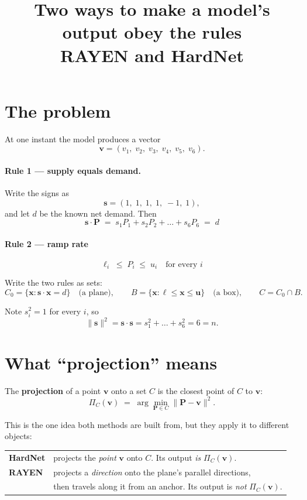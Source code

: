 \documentclass[11pt]{article}
\title{Two ways to make a model's output obey the rules\\
\large RAYEN and HardNet}
\author{}
\date{}
\begin{document}
\maketitle

\section{The problem}

At one instant the model produces a vector
\[
\mathbf{v} = (v_1,\;v_2,\;v_3,\;v_4,\;v_5,\;v_6).
\]

\paragraph{Rule 1 --- supply equals demand.} Write the signs as
\[
\mathbf{s} = (1,\;1,\;1,\;1,\;-1,\;1),
\]
and let $d$ be the known net demand. Then
\[
\boxed{\;\mathbf{s}\cdot\mathbf{P} \;=\; s_1P_1+s_2P_2+\dots+s_6P_6 \;=\; d\;}
\]

\paragraph{Rule 2 --- ramp rate}
\[
\boxed{\;\ell_i \;\le\; P_i \;\le\; u_i \quad\text{for every } i\;}
\]

Write the two rules as sets:
\[
C_0 = \{\mathbf{x} : \mathbf{s}\cdot\mathbf{x} = d\}
\quad\text{(a plane)},
\qquad
B = \{\mathbf{x} : \bm{\ell}\le\mathbf{x}\le\mathbf{u}\}
\quad\text{(a box)},
\qquad
C = C_0\cap B .
\]

Note $s_i^2=1$ for every $i$, so
\[
\|\mathbf{s}\|^2 = \mathbf{s}\cdot\mathbf{s} = s_1^2+\dots+s_6^2 = 6 = n. \tag{$\ast$}
\]

\section{What ``projection'' means}

The \textbf{projection} of a point $\mathbf{v}$ onto a set $C$ is the closest
point of $C$ to $\mathbf{v}$:
\[
\Pi_C(\mathbf{v}) \;=\; \arg\min_{\mathbf{P}\in C} \|\mathbf{P}-\mathbf{v}\|^2 .
\]

This is the one idea both methods are built from, but they apply it to different
objects:

\begin{center}
\begin{tabular}{ll}
\toprule
\textbf{HardNet} & projects the \emph{point} $\mathbf{v}$ onto $C$. Its output \emph{is} $\Pi_C(\mathbf{v})$.\\
\textbf{RAYEN} & projects a \emph{direction} onto the plane's parallel directions,\\
 & then travels along it from an anchor. Its output is \emph{not} $\Pi_C(\mathbf{v})$.\\
\bottomrule
\end{tabular}
\end{center}
\end{document}
